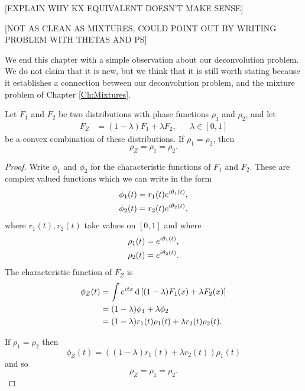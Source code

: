 [EXPLAIN WHY KX EQUIVALENT DOESN'T MAKE SENSE]

[NOT AS CLEAN AS MIXTURES, COULD POINT OUT BY WRITING PROBLEM WITH THETAS AND PS]

We end this chapter with a simple observation about our deconvolution problem. We do not claim that it is new, but we think that it is still worth stating because it establishes a connection between our deconvolution problem, and the mixture problem of Chapter \ref{Ch:Mixtures}.

	\begin{theorem}
	\label{thm:equal phase functions convex set}
		Let $F_1$ and $F_2$ be two distributions with phase functions $\rho_1$ and $\rho_2$, and let
		\begin{align}
			F_Z &= (1 - \lambda) F_1 + \lambda F_2, && \lambda \in [0,1]
		\end{align}
		be a convex combination of these distributions. If $\rho_1 = \rho_2$, then 
		\begin{equation}
			\rho_Z = \rho_1 = \rho_2.
		\end{equation}
	\end{theorem}
	\begin{proof}
		Write $\phi_1$ and $\phi_2$ for the characteristic functions of $F_1$ and $F_2$. These are complex valued functions which we can write in the form
		\begin{align}
			\phi_1(t) &= r_1(t) e^{i\theta_1(t)},\\
			\phi_2(t) &= r_2(t) e^{i\theta_2(t)},
		\end{align}
		where $r_1(t), r_2(t)$ take values on $[0, 1]$ and where
		\begin{align}
			\rho_1(t) &= e^{i\theta_1(t)},\\
			\rho_2(t) &= e^{i\theta_2(t)}.
		\end{align}
		The characteristic function of $F_Z$ is 
		\begin{align}
			\phi_Z(t) &= \int e^{itx} \, \mathrm{d} \left[(1 - \lambda)F_1(x) + \lambda F_2(x)\right]\\
			&= (1 - \lambda)\phi_1 + \lambda \phi_2\\
			&= (1 - \lambda) r_1(t) \rho_1(t) + \lambda r_2(t) \rho_2(t).
		\end{align}

		If $\rho_1 = \rho_2$ then
		\begin{equation}
			\phi_Z(t) = \left((1 - \lambda)r_1(t) + \lambda r_2(t)\right) \rho_1(t)
		\end{equation}
		and so 
		\begin{equation}
			\rho_Z = \rho_1 = \rho_2.
		\end{equation}
	\end{proof}

